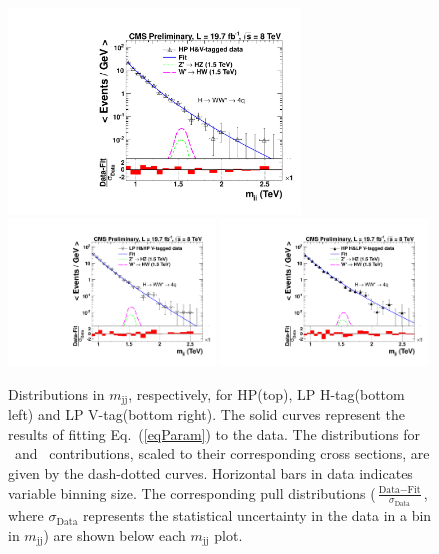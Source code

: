 \begin{figure}[th!b]
\begin{center}
\includegraphics[width=0.69\textwidth]{EXO-14-009/HqqqqZqqfigs/FITS/HwwVqqFitAndPullHighP.pdf}
\includegraphics[width=0.49\textwidth]{EXO-14-009/HqqqqZqqfigs/FITS/HwwVqqFitAndPullLowH.pdf}
\includegraphics[width=0.49\textwidth]{EXO-14-009/HqqqqZqqfigs/FITS/HwwVqqFitAndPullLowV.pdf}
\end{center}
\caption{
Distributions in $m_\mathrm{jj}$, respectively, for
   HP(top), LP H-tag(bottom left) and
   LP V-tag(bottom right).
    The solid curves represent the
   results of fitting Eq.~(\ref{eqParam}) to the data. The
   distributions for \HwwWqq\ and \HwwZqq\
   contributions, scaled to their corresponding cross sections, are
   given by the dash-dotted curves. Horizontal bars
in data indicates variable binning size.
The corresponding pull
   distributions
   ($\frac{\text{Data}-\text{Fit}}{\sigma_{\text{Data}}}$, where
   $\sigma_{\text{Data}}$ represents the statistical uncertainty in
   the data in a bin in $m_\mathrm{jj}$) are shown below each
   $m_\mathrm{jj}$ plot. }
\label{fig:HwwZqqBG}
\end{figure}


\clearpage

